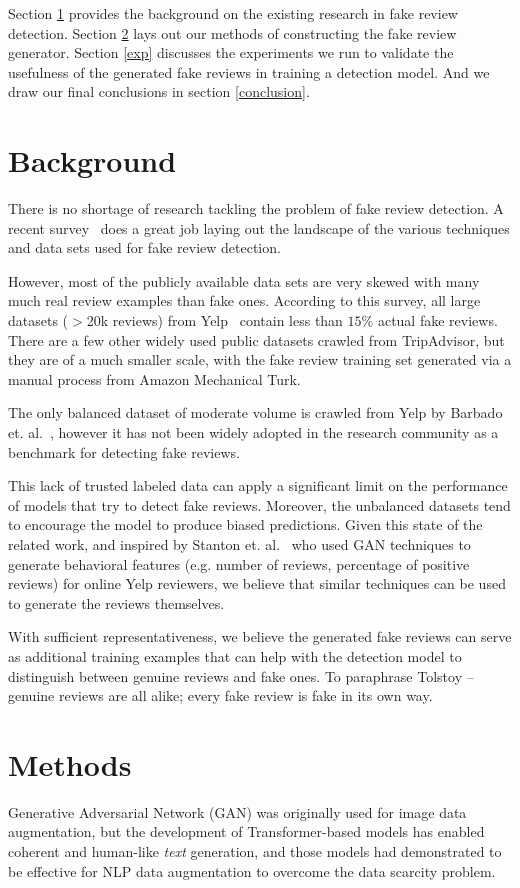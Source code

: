 \documentclass[conference, 11pt]{IEEEtran} %
\theoremstyle{plain}
\theoremstyle{definition}
\begin{document}
Section \ref{bg} provides the background on the existing research in fake review detection. Section \ref{methods} lays out our methods of constructing the fake review generator. Section \ref{exp} discusses the experiments we run to validate the usefulness of the generated fake reviews in training a detection model. And we draw our final conclusions in section \ref{conclusion}.


\section{Background}
\label{bg}
There is no shortage of research tackling the problem of fake review detection. A recent survey~\cite{Mohawesh2021} does a great job laying out the landscape of the various techniques and data sets used for fake review detection.

However, most of the publicly available data sets are very skewed with many much real review examples than fake ones. According to this survey, all large datasets ($>$20k reviews) from Yelp~\cite{rayana2015collective} contain less than $15\%$ actual fake reviews. There are a few other widely used public datasets crawled from TripAdvisor, but they are of a much smaller scale, with the fake review training set generated via a manual process from Amazon Mechanical Turk.

The only balanced dataset of moderate volume is crawled from Yelp by Barbado et. al.~\cite{barbado2019framework}, however it has not been widely adopted in the research community as a benchmark for detecting fake reviews.

This lack of trusted labeled data can apply a significant limit on the performance of models that try to detect fake reviews. Moreover, the unbalanced datasets tend to encourage the model to produce biased predictions. Given this state of the related work, and inspired by Stanton et. al.~\cite{stanton2019gans} who used GAN techniques to generate behavioral features (e.g. number of reviews, percentage of positive reviews) for online Yelp reviewers, we believe that similar techniques can be used to generate the reviews themselves.

With sufficient representativeness, we believe the generated fake reviews can serve as additional training examples that can help with the detection model to distinguish between genuine reviews and fake ones. To paraphrase Tolstoy --  genuine reviews are all alike; every fake review is fake in its own way.


\section{Methods}
\label{methods}
Generative Adversarial Network (GAN) was originally used for image data augmentation, but the development of Transformer-based models has enabled coherent and human-like \textit{text} generation, and those models had demonstrated to be effective for NLP data augmentation to overcome the data scarcity problem.
\end{document}
